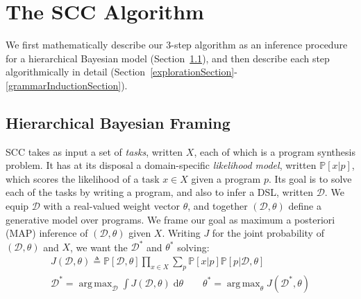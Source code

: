 \documentclass{article}
\newcommand{\system}{\textsc{SCC} }
\DeclareMathOperator*{\argmax}{arg\,max} %
\newcommand{\probability}{\mathds{P}} %
\begin{document}



 \section{The \system Algorithm}
 We first mathematically describe our 3-step algorithm as
 an inference procedure for a hierarchical Bayesian model (Section~\ref{mathematicalFraming}),
  and then describe each step algorithmically in detail (Section~\ref{explorationSection}-\ref{grammarInductionSection}).

 \subsection{Hierarchical Bayesian Framing}\label{mathematicalFraming}

\system takes as input a set of \emph{tasks}, written $X$, each of which is a program synthesis problem.
It has at its disposal a domain-specific \emph{likelihood model}, written $\probability[x|p]$, which scores the likelihood of a task $x\in X$ given a program $p$.%
Its goal is to solve each of the tasks by writing a program,
and also to infer a DSL, written $\mathcal{D}$.
We equip $\mathcal{D}$ with a real-valued weight vector $\theta$, and together
$(\mathcal{D},\theta)$ define a generative model over programs.
We frame our goal as maximum a posteriori (MAP) inference of $(\mathcal{D},\theta)$ given $X$.
Writing $J$ for the joint probability of $(\mathcal{D},\theta)$ and $X$, we want the $\mathcal{D}^*$ and $\theta^*$ solving:
\begin{align}\label{intractableObjectives}
\nonumber  J(\mathcal{D},\theta)\triangleq \probability[\mathcal{D},\theta]\prod_{x\in X} \sum_p \probability[x|p]\probability[p|\mathcal{D},\theta]\\
  \mathcal{D}^* = \argmax_{\mathcal{D}}\int J(\mathcal{D},\theta)\;\mathrm{d}\theta \qquad
  \theta^* =\argmax_\theta J(\mathcal{D}^*,\theta)
\end{align}
\end{document}
